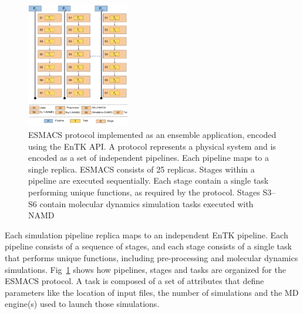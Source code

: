 \begin{figure}
\centering
  \includegraphics[width=0.4\textwidth]{HTBAC_Workflow_ESMACS.pdf}
  \caption{ESMACS protocol implemented as an ensemble application, encoded
  using the EnTK API\@. A protocol represents a physical system and is
  encoded as a set of independent pipelines. Each pipeline maps to a single
  replica. ESMACS consists of 25 replicas. Stages within a pipeline are
  executed sequentially. Each stage contain a single task performing unique
  functions, as required by the protocol. Stages S3--S6 contain molecular
  dynamics simulation tasks executed with NAMD}
  \label{figure:HTBAC}
\end{figure}


Each simulation pipeline replica maps to an independent EnTK pipeline. Each
pipeline consists of a sequence of stages, and each stage consists of a single
task that performs unique functions, including pre-processing and molecular
dynamics simulations. Fig~\ref{figure:HTBAC} shows how pipelines, stages and
tasks are organized for the ESMACS protocol. A task is composed of a set of
attributes that define parameters like the location of input files, the number
of simulations and the MD engine(s) used to launch those simulations.




